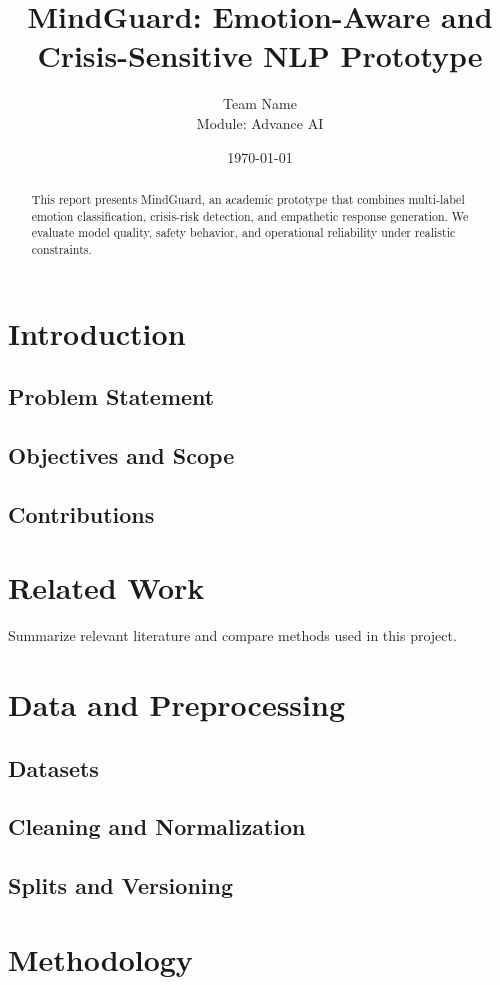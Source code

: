 \documentclass[11pt,a4paper]{article}
\title{MindGuard: Emotion-Aware and Crisis-Sensitive NLP Prototype}
\author{Team Name \\ Module: Advance AI}
\date{\today}
\begin{document}
\maketitle

\begin{abstract}
This report presents MindGuard, an academic prototype that combines multi-label emotion classification, crisis-risk detection, and empathetic response generation. We evaluate model quality, safety behavior, and operational reliability under realistic constraints.
\end{abstract}

\section{Introduction}
\subsection{Problem Statement}
\subsection{Objectives and Scope}
\subsection{Contributions}

\section{Related Work}
Summarize relevant literature and compare methods used in this project.

\section{Data and Preprocessing}
\subsection{Datasets}
\subsection{Cleaning and Normalization}
\subsection{Splits and Versioning}

\section{Methodology}
\end{document}
